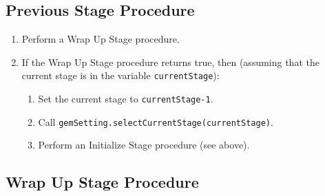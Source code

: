 \documentclass[11pt]{article}
\begin{document}
\subsection{Previous Stage Procedure}

\begin{enumerate}
\item Perform a Wrap Up Stage procedure.
\item If the Wrap Up Stage procedure returns true, then (assuming
  that the current stage is in the variable {\tt currentStage}):
  \begin{enumerate}
  \item Set the current stage to \verb/currentStage-1/.
  \item Call {\tt gemSetting.selectCurrentStage(currentStage)}.
  \item Perform an Initialize Stage procedure (see above).
  \end{enumerate}
\end{enumerate}

\subsection{Wrap Up Stage Procedure}
\end{document}
